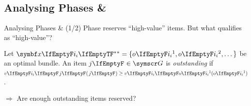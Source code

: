 \subsection{Analysing Phases \texorpdfstring{\phasei{} \& \phaseiii}{I \& III}}
\begin{frame}{Analysing Phases \phasei{} \& \phaseiii{} (1/2)}
	Phase \phasei{} reserves \enquote{high-value} items.
	But what qualifies as \enquote{high-value}?

	\begin{definition}[14]
		Let \(\alloc* = \{ \asgd*{1}, \asgd*{2}, \dots\}\) be an optimal bundle.
		An item \(\genericitem \in \goods\) is \emph{outstanding} if \(\valuations[ \hairspace \genericitem] \ge \valuations[\asgd*{1}]\).
	\end{definition}

	\(\Rightarrow\) Are enough outstanding items reserved?
\end{frame}

